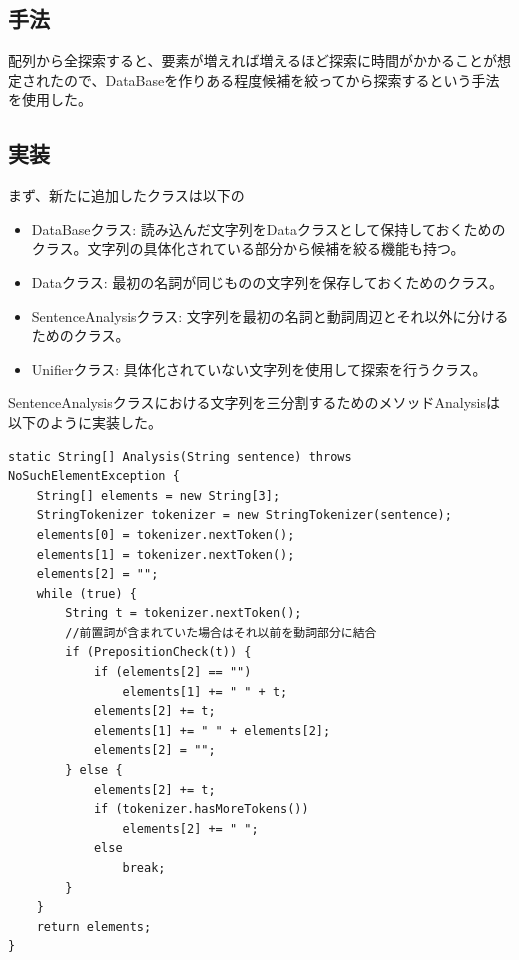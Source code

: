 \documentclass{jarticle}
\begin{document}
\subsection{手法}
配列から全探索すると、要素が増えれば増えるほど探索に時間がかかることが想定されたので、DataBaseを作りある程度候補を絞ってから探索するという手法を使用した。

\subsection{実装}
まず、新たに追加したクラスは以下の
\begin{itemize}
\item DataBaseクラス: 読み込んだ文字列をDataクラスとして保持しておくためのクラス。文字列の具体化されている部分から候補を絞る機能も持つ。
\item Dataクラス: 最初の名詞が同じものの文字列を保存しておくためのクラス。
\item SentenceAnalysisクラス: 文字列を最初の名詞と動詞周辺とそれ以外に分けるためのクラス。
\item Unifierクラス: 具体化されていない文字列を使用して探索を行うクラス。
\end{itemize}

SentenceAnalysisクラスにおける文字列を三分割するためのメソッドAnalysisは以下のように実装した。

\begin{lstlisting}[caption=SentenceAnalysisのAnalysis,label=src:Analysis]
static String[] Analysis(String sentence) throws NoSuchElementException {
	String[] elements = new String[3];
	StringTokenizer tokenizer = new StringTokenizer(sentence);
	elements[0] = tokenizer.nextToken();
	elements[1] = tokenizer.nextToken();
	elements[2] = "";
	while (true) {
		String t = tokenizer.nextToken();
        //前置詞が含まれていた場合はそれ以前を動詞部分に結合
		if (PrepositionCheck(t)) {
			if (elements[2] == "")
				elements[1] += " " + t;
			elements[2] += t;
			elements[1] += " " + elements[2];
			elements[2] = "";
		} else {
			elements[2] += t;
			if (tokenizer.hasMoreTokens())
				elements[2] += " ";
			else
				break;
		}
	}
	return elements;
}
\end{lstlisting}
\end{document}
